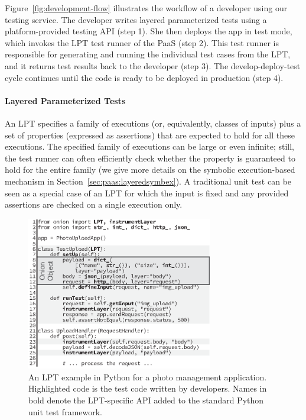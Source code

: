 Figure~\ref{fig:development-flow} illustrates the workflow of a developer using our testing service.
%
The developer writes layered parameterized tests using a platform-provided testing API (step 1). She then deploys the app in test mode, which invokes the LPT test runner of the PaaS (step 2). This test runner is responsible for generating and running the individual test cases from the LPT, and it returns test results back to the developer (step 3). The develop-deploy-test cycle continues until the code is ready to be deployed in production (step 4).


\paragraph{Layered Parameterized Tests}

An LPT specifies a family of executions (or, equivalently, classes of inputs) plus a set of properties (expressed as assertions) that are expected to hold for all these executions.
%
The specified family of executions can be large or even infinite; still, the test runner can often efficiently check whether the property is guaranteed to hold for the entire family (we give more details on the symbolic execution-based mechanism in Section~\ref{sec:paas:layeredsymbex}).  A traditional unit test can be seen as a special case of an LPT for which the input is fixed and any provided assertions are checked on a single execution only.

\begin{figure}
  \centering
  \includegraphics[width=3.2in]{figures/paas/overlay}
  \caption{An LPT example in Python for a photo management application.  Highlighted code is the test code written by developers.  Names in bold denote the LPT-specific API added to the standard Python unit test framework.}
  \label{fig:test-lpt}
\end{figure}

